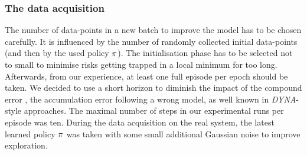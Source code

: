 \documentclass[
reprint,nofootinbib,
amsmath,amssymb,amsfonts,clevref,
aps,
prstab,
]{revtex4-2}
\newcommand{\tocheck}[1]{\textcolor{blue}{#1}}
\begin{document}
	\subsubsection{The data acquisition}
	The number of data-points in a new batch to improve the model has to be chosen carefully. It is influenced by the number of randomly collected initial data-points (and then by the used policy $\pi$). The initialisation phase has to be selected not to small to minimise risks getting trapped in a local minimum for too long. Afterwards, from our experience, at least one full episode per epoch should be taken. We decided to use a short horizon to diminish the impact of the compound error \cite{Janner2019}, the accumulation error following a wrong model, as well known in \emph{DYNA}-style approaches. The maximal number of steps in our experimental runs per episode was ten. During the data acquisition on the real system, the latest learned policy $\pi$ was taken with some small additional Gaussian noise to improve exploration.
\end{document}

